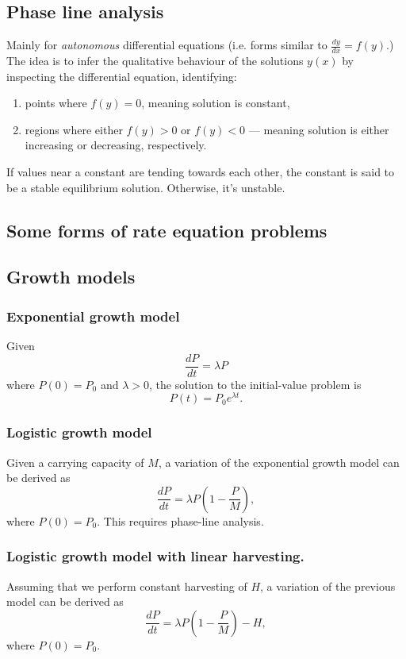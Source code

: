 \documentclass[main.tex]{subfiles}
\begin{document}
	\subsection*{Phase line analysis}
	Mainly for \emph{autonomous} differential equations (i.e. forms similar to \(\frac{dy}{dx} = f(y)\).)
	The idea is to infer the qualitative behaviour of the solutions \(y(x)\) by inspecting the differential equation, identifying:
	\begin{enumerate}
	\item points where \(f(y) = 0\), meaning solution is constant,
	\item regions where either \(f(y) > 0\) or \(f(y) < 0\) --- meaning solution is either increasing or decreasing, respectively.
	\end{enumerate}

	If values near a constant are tending towards each other, the constant is said to be a stable equilibrium solution. Otherwise, it's unstable.

	\subsection*{Some forms of rate equation problems}

	\subsection*{Growth models}
	\subsubsection*{Exponential growth model}
	Given \[\frac{dP}{dt} = \lambda P\] where \(P(0) = P_0\) and \(\lambda > 0\), the solution to the initial-value problem is
	\[P(t) = P_0e^{\lambda t}.\]

	\subsubsection*{Logistic growth model}
	Given a carrying capacity of \(M\), a variation of the exponential growth model can be derived as \[\frac{dP}{dt} = \lambda P \left(1 - \frac{P}{M}\right),\] where \(P(0) = P_0.\) This requires phase-line analysis.

	\subsubsection*{Logistic growth model with linear harvesting.}
	Assuming that we perform constant harvesting of \(H\), a variation of the previous model can be derived as \[\frac{dP}{dt} = \lambda P \left(1 - \frac{P}{M}\right) - H,\] where \(P(0) = P_0.\)


\ifSubfilesClassLoaded{%
\end{multicols}
}{}
\end{document}
